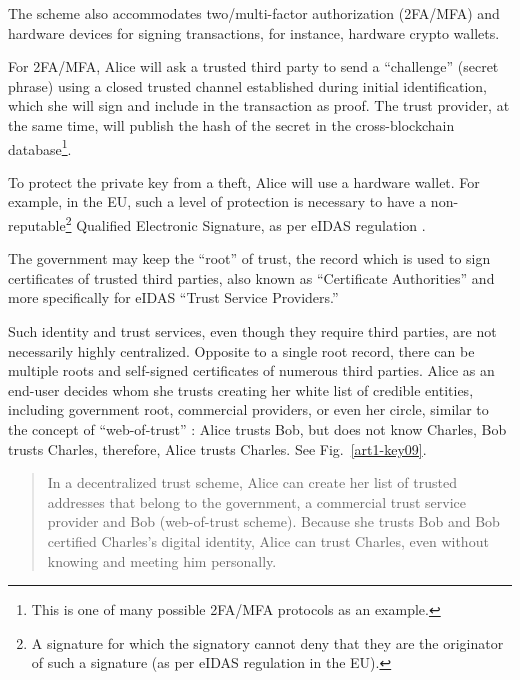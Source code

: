\begin{multicols}{2}
The scheme also accommodates two/multi-factor authorization (2FA/MFA) and hardware devices for signing transactions, for instance, hardware crypto wallets.

For 2FA/MFA, Alice will ask a trusted third party to send a “challenge” (secret phrase) using a closed trusted channel established during initial identification, which she will sign and include in the transaction as proof. The trust provider, at the same time, will publish the hash of the secret in the cross-blockchain database\footnote{This is one of many possible 2FA/MFA protocols as an example.}.

To protect the private key from a theft, Alice will use a hardware wallet. For example, in the EU, such a level of protection is necessary to have a non-reputable\footnote{A signature for which the signatory cannot deny that they are the originator of such a signature (as per eIDAS regulation in the EU).} Qualified Electronic Signature, as per eIDAS regulation \cite{art1-key43}.

The government may keep the “root” of trust, the record which is used to sign certificates of trusted third parties, also known as “Certificate Authorities” and more specifically for eIDAS “Trust Service Providers.”

Such identity and trust services, even though they require third parties, are not necessarily highly centralized. Opposite to a single root record, there can be multiple roots and self-signed certificates of numerous third parties. Alice as an end-user decides whom she trusts creating her white list of credible entities, including government root, commercial providers, or even her circle, similar to the concept of “web-of-trust” \cite{art1-key44}: Alice trusts Bob, but does not know Charles, Bob trusts Charles, therefore, Alice trusts Charles. See Fig.~\ref{art1-key09}.

\begin{quote}
In a decentralized trust scheme, Alice can create her list of trusted addresses that belong to the government, a commercial trust service provider and Bob (web-of-trust scheme). Because she trusts Bob and Bob certified Charles’s digital identity, Alice can trust Charles, even without knowing and meeting him personally.
\end{quote}


\end{multicols}
